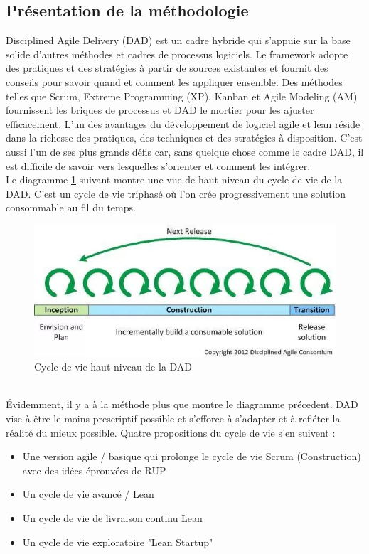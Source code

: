 \begin{spacing}{1.5}
\subsection{Présentation de la méthodologie}
Disciplined Agile Delivery (DAD) est un cadre hybride qui s'appuie sur la base solide d'autres méthodes et cadres de processus logiciels. Le framework adopte des pratiques et des stratégies à partir de sources existantes et fournit des conseils pour savoir quand et comment les appliquer ensemble. Des méthodes telles que Scrum, Extreme Programming (XP), Kanban et Agile Modeling (AM) fournissent les briques de processus et DAD le mortier pour les ajuster efficacement. L'un des avantages du développement de logiciel agile et lean réside dans la richesse des pratiques, des techniques et des stratégies à disposition. C'est aussi l'un de ses plus grands défis car, sans quelque chose comme le cadre DAD, il est difficile de savoir vers lesquelles s'orienter et comment les intégrer.\\
Le diagramme \ref{fig:triphaseCycleDAD} suivant montre une vue de haut niveau du cycle de vie de la DAD. C'est un cycle de vie triphasé où l'on crée progressivement une solution consommable au fil du temps.\\

\begin{figure}[h]
\centering
\includegraphics[width=0.8\linewidth]{triphaseCycleDAD.jpg}
\caption{Cycle de vie haut niveau de la DAD}
\label{fig:triphaseCycleDAD}
\end{figure}
\\
Évidemment, il y a à la méthode plus que montre le diagramme précedent. DAD vise à être le moins prescriptif possible et s'efforce à s'adapter et à refléter la réalité du mieux possible. Quatre propositions du cycle de vie s'en suivent :
\begin{itemize}
    \item Une version agile / basique qui prolonge le cycle de vie Scrum (Construction) avec des idées éprouvées de RUP
    \item Un cycle de vie avancé / Lean
    \item Un cycle de vie de livraison continu Lean
    \item Un cycle de vie exploratoire "Lean Startup"
\end{itemize}\\


\end{spacing}
